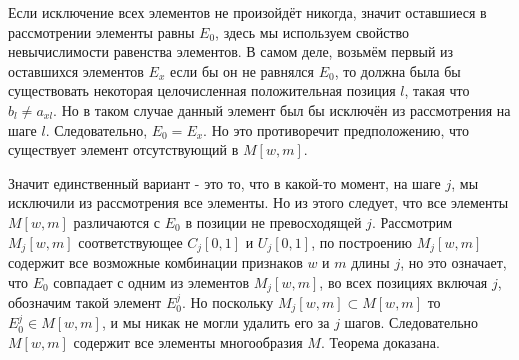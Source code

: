 \documentclass[12pt]{article}
\begin{document}
Если исключение всех элементов не произойдёт никогда, значит оставшиеся в рассмотрении элементы равны $E_0$, здесь мы используем свойство невычислимости равенства элементов. В самом деле, возьмём первый из оставшихся элементов $E_x$ если бы он не равнялся $E_0$, то должна была бы существовать некоторая целочисленная положительная позиция $l$, такая что $b_l \neq a_{xl}$. Но в таком случае данный элемент был бы исключён из рассмотрения на шаге $l$. Следовательно, $E_0 = E_x$. Но это противоречит предположению, что существует элемент отсутствующий в $M[w, m]$.

Значит единственный вариант - это то, что в какой-то момент, на шаге $j$, мы исключили из рассмотрения все элементы. Но из этого следует, что все элементы $M[w, m]$ различаются с $E_0$ в позиции не превосходящей $j$. Рассмотрим $M_j[w, m]$ соответствующее $C_j[0, 1]$ и $U_j[0, 1]$, по построению $M_j[w, m]$ содержит все возможные комбинации признаков $w$ и $m$ длины $j$, но это означает, что $E_0$ совпадает с одним из элементов $M_j[w, m]$, во всех позициях включая $j$, обозначим такой элемент $E^j_0$. Но поскольку $M_j[w, m] \subset M[w, m]$ то $E^j_0 \in M[w, m]$, и мы никак не могли удалить его за $j$ шагов. Следовательно $M[w, m]$ содержит все элементы многообразия $M$. Теорема доказана.
\end{document}
